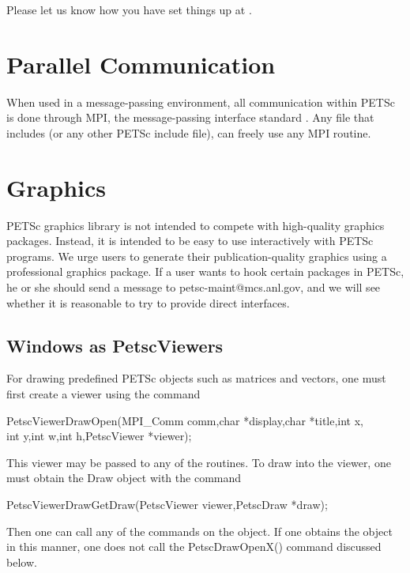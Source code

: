 {{{Please let us know how you have set things up at .


\section{Parallel Communication}

When used in a message-passing environment, all communication 
within
PETSc is done through MPI, the message-passing interface standard
\cite{MPI-final}.  Any file that includes  (or any other 
PETSc include file), can freely use any MPI routine.

\section{Graphics}

PETSc graphics library is not intended to compete with 
high-quality graphics packages.  Instead, it is intended to be 
easy to use interactively with PETSc programs. We urge users
to generate their publication-quality graphics using a
professional graphics package. If a user wants to hook
certain packages in PETSc, he or she should send a message to 
petsc-maint@mcs.anl.gov, and we will see whether it is reasonable
to try to provide direct interfaces.

\subsection{Windows as PetscViewers}
For drawing predefined PETSc objects such as matrices and vectors, one must 
first create a viewer using the 
command 
\begin{tabbing}
  PetscViewerDrawOpen(MPI\_Comm comm,char *display,char *title,int x,\\
                       int y,int w,int h,PetscViewer *viewer);
\end{tabbing}
This viewer may be passed to any of the  routines.
To draw into the viewer, one must obtain the Draw object with the
command 
\begin{tabbing}
  PetscViewerDrawGetDraw(PetscViewer viewer,PetscDraw *draw);
\end{tabbing}
Then one can call any of the  commands on the 
object. If one obtains the  object in this manner, 
one does not call the PetscDrawOpenX() command discussed below.

}}}
